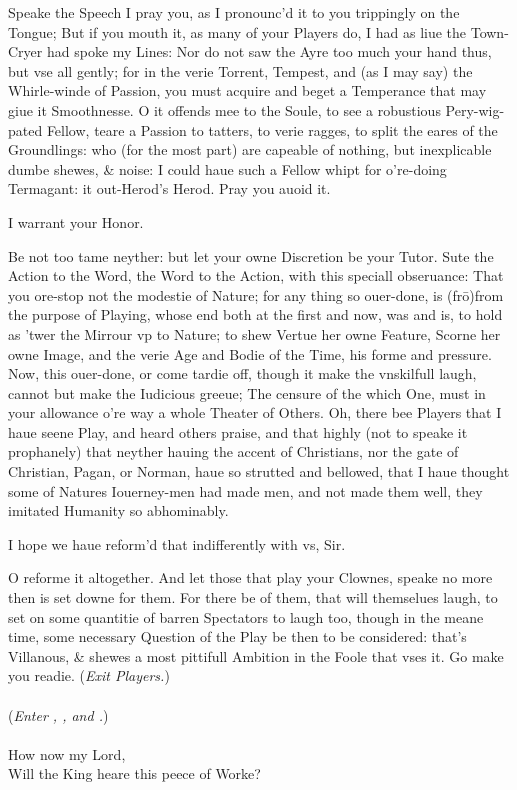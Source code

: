 \documentclass[a5paper,DIV=calc,11pt]{scrbook}
\newcommand{\updatemarks}{\markboth{Act \Roman{act}}{Scene \Roman{act}--\Roman{scene}}}
\begin{document}
\updatemarks


\begin{drama*}
    \hamspeaks Speake the Speech I pray you, as I pronounc'd it to you trippingly on the Tongue; But if you mouth it, as many of your Players do, I had as liue the Town-Cryer had spoke my Lines: Nor do not saw the Ayre too much your hand thus, but vse all gently; for in the verie Torrent, Tempest, and (as I may say) the Whirle-winde of Passion, you must acquire and beget a Temperance that may giue it Smoothnesse. O it offends mee to the Soule, to see a robustious Pery-wig-pated Fellow, teare a Passion to tatters, to verie ragges, to split the eares of the Groundlings: who (for the most part) are capeable of nothing, but inexplicable dumbe shewes, \& noise: I could haue such a Fellow whipt for o're-doing Termagant: it out-Herod's Herod. Pray you auoid it.
    
     I warrant your Honor.
    
    \hamspeaks Be not too tame neyther: but let your owne Discretion be your Tutor. Sute the Action to the Word, the Word to the Action, with this speciall obseruance: That you ore-stop not the modestie of Nature; for any thing so ouer-done, is (frō)from the purpose of Playing, whose end both at the first and now, was and is, to hold as 'twer the Mirrour vp to Nature; to shew Vertue her owne Feature, Scorne her owne Image, and the verie Age and Bodie of the Time, his forme and pressure. Now, this ouer-done, or come tardie off, though it make the vnskilfull laugh, cannot but make the Iudicious greeue; The censure of the which One, must in your allowance o're way a whole Theater of Others. Oh, there bee Players that I haue seene Play, and heard others praise, and that highly (not to speake it prophanely) that neyther hauing the accent of Christians, nor the gate of Christian, Pagan, or Norman, haue so strutted and bellowed, that I haue thought some of Natures Iouerney-men had made men, and not made them well, they imitated Humanity so abhominably.
    
     I hope we haue reform'd that indifferently with vs, Sir.
    
    \hamspeaks O reforme it altogether. And let those that play your Clownes, speake no more then is set downe for them. For there be of them, that will themselues laugh, to set on some quantitie of barren Spectators to laugh too, though in the meane time, some necessary Question of the Play be then to be considered: that's Villanous, \& shewes a most pittifull Ambition in the Foole that vses it. Go make you readie. \hfill(\textit{Exit Players.})\\
    \mbox{}\\
    (\textit{Enter \pol, \rosin, and \guil.})\\
    \mbox{}\\
    How now my Lord,\\
    Will the King heare this peece of Worke?
    

\end{drama*}
\end{document}
